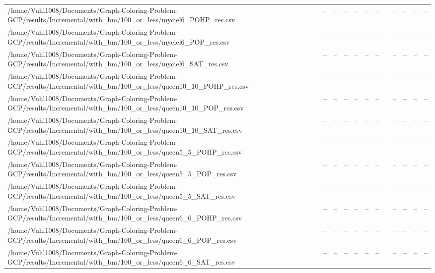 \begin{table}[htbp]
\begin{tabular}{llllllllllll}
/home/Vuhl1008/Documents/Graph-Coloring-Problem-GCP/results/Incremental/with\_bm/100\_or\_less/myciel6\_POHP\_res.csv & -- & -- & -- & -- & -- & -- & {} & -- & -- & -- & -- \\
/home/Vuhl1008/Documents/Graph-Coloring-Problem-GCP/results/Incremental/with\_bm/100\_or\_less/myciel6\_POP\_res.csv & -- & -- & -- & -- & -- & -- & {} & -- & -- & -- & -- \\
/home/Vuhl1008/Documents/Graph-Coloring-Problem-GCP/results/Incremental/with\_bm/100\_or\_less/myciel6\_SAT\_res.csv & -- & -- & -- & -- & -- & -- & {} & -- & -- & -- & -- \\
/home/Vuhl1008/Documents/Graph-Coloring-Problem-GCP/results/Incremental/with\_bm/100\_or\_less/queen10\_10\_POHP\_res.csv & -- & -- & -- & -- & -- & -- & {} & -- & -- & -- & -- \\
/home/Vuhl1008/Documents/Graph-Coloring-Problem-GCP/results/Incremental/with\_bm/100\_or\_less/queen10\_10\_POP\_res.csv & -- & -- & -- & -- & -- & -- & {} & -- & -- & -- & -- \\
/home/Vuhl1008/Documents/Graph-Coloring-Problem-GCP/results/Incremental/with\_bm/100\_or\_less/queen10\_10\_SAT\_res.csv & -- & -- & -- & -- & -- & -- & {} & -- & -- & -- & -- \\
/home/Vuhl1008/Documents/Graph-Coloring-Problem-GCP/results/Incremental/with\_bm/100\_or\_less/queen5\_5\_POHP\_res.csv & -- & -- & -- & -- & -- & -- & {} & -- & -- & -- & -- \\
/home/Vuhl1008/Documents/Graph-Coloring-Problem-GCP/results/Incremental/with\_bm/100\_or\_less/queen5\_5\_POP\_res.csv & -- & -- & -- & -- & -- & -- & {} & -- & -- & -- & -- \\
/home/Vuhl1008/Documents/Graph-Coloring-Problem-GCP/results/Incremental/with\_bm/100\_or\_less/queen5\_5\_SAT\_res.csv & -- & -- & -- & -- & -- & -- & {} & -- & -- & -- & -- \\
/home/Vuhl1008/Documents/Graph-Coloring-Problem-GCP/results/Incremental/with\_bm/100\_or\_less/queen6\_6\_POHP\_res.csv & -- & -- & -- & -- & -- & -- & {} & -- & -- & -- & -- \\
/home/Vuhl1008/Documents/Graph-Coloring-Problem-GCP/results/Incremental/with\_bm/100\_or\_less/queen6\_6\_POP\_res.csv & -- & -- & -- & -- & -- & -- & {} & -- & -- & -- & -- \\
/home/Vuhl1008/Documents/Graph-Coloring-Problem-GCP/results/Incremental/with\_bm/100\_or\_less/queen6\_6\_SAT\_res.csv & -- & -- & -- & -- & -- & -- & {} & -- & -- & -- & -- \\

\end{tabular}
\end{table}
